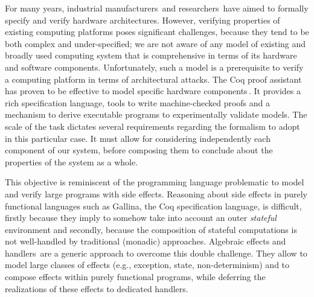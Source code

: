 For many years, industrial manufacturers\,\cite{reid2017arm,leslie2015sgx} and
researchers\,\cite{chong2016report,choi2017kami} have aimed to formally specify
and verify hardware architectures.
%
However, verifying properties of existing computing platforms poses significant
challenges, because they tend to be both complex and under-specified; we are not
aware of any model of existing and broadly used computing system that is
comprehensive in terms of its hardware and software components.
%
Unfortunately, such a model is a prerequisite to verify a computing platform in
terms of architectural attacks.
%
The Coq proof assistant\,\cite{coq} has proven to be effective to model specific
hardware
components\,\cite{braibant2011coquet,morrisett2012rocksalt,choi2017kami,jomaa2016mmu}.
%
It provides a rich specification language, tools to write machine-checked proofs
and a mechanism to derive executable programs to experimentally validate models.
%
The scale of the task dictates several requirements regarding the formalism to
adopt in this particular case.
%
It must allow for considering independently each component of our system, before
composing them to conclude about the properties of the system as a whole.

This objective is reminiscent of the programming language problematic to model
and verify large programs with side effects.
%
Reasoning about side effects in purely functional languages such as {\sc
  Gallina}, the Coq specification language, is difficult, firstly because they
  imply to somehow take into account an outer \emph{stateful} environment and
  secondly, because the composition of stateful computations is not well-handled
  by traditional (monadic) approaches.
%
Algebraic effects and handlers\,\cite{bauer2015effects} are a generic approach
to overcome this double challenge.
%
They allow to model large classes of effects (e.g., exception, state,
non-determinism) and to compose effects within purely functional programs, while
deferring the realizations of these effects to dedicated handlers.

